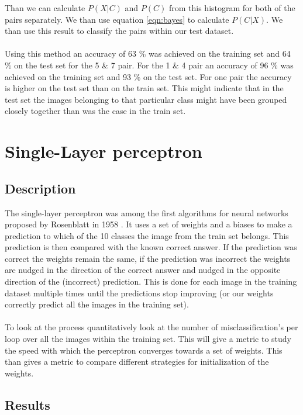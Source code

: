 \documentclass[10 pt, a4paper]{article}
\begin{document}
Than we can calculate $P(X|C)$ and $P(C)$ from this histogram for both of the pairs separately. We than use equation \ref{eqn:bayes} to calculate $P(C|X)$. We than use this result to classify the pairs within our test dataset.
\\
\\
Using this method an accuracy of  63 \% was achieved on the training set and 64 \% on the test set for the 5 \& 7 pair. For the 1 \& 4 pair an accuracy of 96 \% was achieved on the training set and 93 \% on the test set. For one pair the accuracy is higher on the test set than on the train set. This might indicate that in the test set the images belonging to that particular class might have been grouped closely together than was the case in the train set.


\section{Single-Layer perceptron} \label{sec:perceptron}

\subsection{Description}

The single-layer perceptron was among the first algorithms for neural networks proposed by Rosenblatt in 1958 \cite{rosenblatt}. It uses a set of weights and a biases to make a prediction to which of the 10 classes the image from the train set belongs. This prediction is then compared with the known correct answer. If the prediction was correct the weights remain the same, if the prediction was incorrect the weights are nudged in the direction of the correct answer and nudged in the opposite direction of the (incorrect) prediction. This is done for each image in the training dataset multiple times until the predictions stop improving (or our weights correctly predict all the images in the training set).
\\
\\
To look at the process quantitatively look at the number of misclassification's per loop over all the images within the training set. This will give a metric to study the speed with which the perceptron converges towards a set of weights. This than gives  a metric to compare different strategies for initialization of the weights. 

\subsection{Results}
\end{document}
